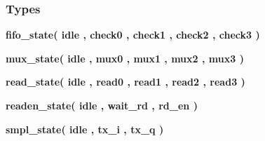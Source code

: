 \subsubsection*{Types}
 \begin{DoxyCompactItemize}
\item 
{\bfseries {\bf fifo\+\_\+state}{\bfseries \textcolor{vhdlchar}{(}\textcolor{vhdlchar}{ }\textcolor{vhdlchar}{idle}\textcolor{vhdlchar}{ }\textcolor{vhdlchar}{,}\textcolor{vhdlchar}{ }\textcolor{vhdlchar}{check0}\textcolor{vhdlchar}{ }\textcolor{vhdlchar}{,}\textcolor{vhdlchar}{ }\textcolor{vhdlchar}{check1}\textcolor{vhdlchar}{ }\textcolor{vhdlchar}{,}\textcolor{vhdlchar}{ }\textcolor{vhdlchar}{check2}\textcolor{vhdlchar}{ }\textcolor{vhdlchar}{,}\textcolor{vhdlchar}{ }\textcolor{vhdlchar}{check3}\textcolor{vhdlchar}{ }\textcolor{vhdlchar}{)}\textcolor{vhdlchar}{ }}} 
\item 
{\bfseries {\bf mux\+\_\+state}{\bfseries \textcolor{vhdlchar}{(}\textcolor{vhdlchar}{ }\textcolor{vhdlchar}{idle}\textcolor{vhdlchar}{ }\textcolor{vhdlchar}{,}\textcolor{vhdlchar}{ }\textcolor{vhdlchar}{mux0}\textcolor{vhdlchar}{ }\textcolor{vhdlchar}{,}\textcolor{vhdlchar}{ }\textcolor{vhdlchar}{mux1}\textcolor{vhdlchar}{ }\textcolor{vhdlchar}{,}\textcolor{vhdlchar}{ }\textcolor{vhdlchar}{mux2}\textcolor{vhdlchar}{ }\textcolor{vhdlchar}{,}\textcolor{vhdlchar}{ }\textcolor{vhdlchar}{mux3}\textcolor{vhdlchar}{ }\textcolor{vhdlchar}{)}\textcolor{vhdlchar}{ }}} 
\item 
{\bfseries {\bf read\+\_\+state}{\bfseries \textcolor{vhdlchar}{(}\textcolor{vhdlchar}{ }\textcolor{vhdlchar}{idle}\textcolor{vhdlchar}{ }\textcolor{vhdlchar}{,}\textcolor{vhdlchar}{ }\textcolor{vhdlchar}{read0}\textcolor{vhdlchar}{ }\textcolor{vhdlchar}{,}\textcolor{vhdlchar}{ }\textcolor{vhdlchar}{read1}\textcolor{vhdlchar}{ }\textcolor{vhdlchar}{,}\textcolor{vhdlchar}{ }\textcolor{vhdlchar}{read2}\textcolor{vhdlchar}{ }\textcolor{vhdlchar}{,}\textcolor{vhdlchar}{ }\textcolor{vhdlchar}{read3}\textcolor{vhdlchar}{ }\textcolor{vhdlchar}{)}\textcolor{vhdlchar}{ }}} 
\item 
{\bfseries {\bf readen\+\_\+state}{\bfseries \textcolor{vhdlchar}{(}\textcolor{vhdlchar}{ }\textcolor{vhdlchar}{idle}\textcolor{vhdlchar}{ }\textcolor{vhdlchar}{,}\textcolor{vhdlchar}{ }\textcolor{vhdlchar}{wait\+\_\+rd}\textcolor{vhdlchar}{ }\textcolor{vhdlchar}{,}\textcolor{vhdlchar}{ }\textcolor{vhdlchar}{rd\+\_\+en}\textcolor{vhdlchar}{ }\textcolor{vhdlchar}{)}\textcolor{vhdlchar}{ }}} 
\item 
{\bfseries {\bf smpl\+\_\+state}{\bfseries \textcolor{vhdlchar}{(}\textcolor{vhdlchar}{ }\textcolor{vhdlchar}{idle}\textcolor{vhdlchar}{ }\textcolor{vhdlchar}{,}\textcolor{vhdlchar}{ }\textcolor{vhdlchar}{tx\+\_\+i}\textcolor{vhdlchar}{ }\textcolor{vhdlchar}{,}\textcolor{vhdlchar}{ }\textcolor{vhdlchar}{tx\+\_\+q}\textcolor{vhdlchar}{ }\textcolor{vhdlchar}{)}\textcolor{vhdlchar}{ }}} 
\end{DoxyCompactItemize}
